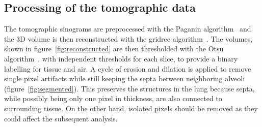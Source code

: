 \subsection{Processing of the tomographic data}\label{sec:tomoprocessing}
The tomographic sinograms are preprocessed with the Paganin
algorithm~\cite{Paganin_2002} and
the 3D volume is then reconstructed with the gridrec
algorithm~\cite{Marone:pp5022}. The volumes, shown in
figure~\ref{fig:reconstructed} are then thresholded with the Otsu
algorithm~\cite{Otsu_1979}, with independent thresholds for each slice, to
provide a binary labelling for tissue and air. A cycle of
erosion and dilation is applied to remove single pixel artifacts while still
keeping the septa between neighboring alveoli (figure~\ref{fig:segmented}). This preserves the structures
in the lung because septa, while possibly being only one pixel in thickness,
are also connected to surrounding tissue. On the other hand, isolated pixels
should be removed as they could affect the subsequent analysis.

